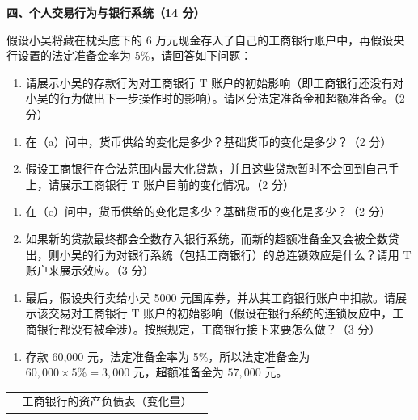 \textbf{四、个人交易行为与银行系统（14 分）}

\begin{question}
假设小吴将藏在枕头底下的 6 万元现金存入了自己的工商银行账户中，再假设央行设置的法定准备金率为 5\%，请回答如下问题：
\begin{enumerate}[label=(\alph*),leftmargin=2.5em]
  \item 请展示小吴的存款行为对工商银行 T 账户的初始影响（即工商银行还没有对小吴的行为做出下一步操作时的影响）。请区分法定准备金和超额准备金。（2 分）
\end{enumerate}
\begin{enumerate}[label=(\alph*),leftmargin=2.5em,resume]
  \item 在（a）问中，货币供给的变化是多少？基础货币的变化是多少？（2 分）
  \item 假设工商银行在合法范围内最大化贷款，并且这些贷款暂时不会回到自己手上，请展示工商银行 T 账户目前的变化情况。（2 分）
\end{enumerate}
\begin{enumerate}[label=(\alph*),leftmargin=2.5em,resume]
  \item 在（c）问中，货币供给的变化是多少？基础货币的变化是多少？（2 分）
  \item 如果新的贷款最终都会全数存入银行系统，而新的超额准备金又会被全数贷出，则小吴的行为对银行系统（包括工商银行）的总连锁效应是什么？请用 T 账户来展示效应。（3 分）
\end{enumerate}
\begin{enumerate}[label=(\alph*),leftmargin=2.5em,resume]
  \item 最后，假设央行卖给小吴 5000 元国库券，并从其工商银行账户中扣款。请展示该交易对工商银行 T 账户的初始影响（假设在银行系统的连锁反应中，工商银行都没有被牵涉）。按照规定，工商银行接下来要怎么做？（3 分）
\end{enumerate}
\begin{solution}
\begin{enumerate}[label=(\alph*),leftmargin=2.5em]
  \item 存款 60,000 元，法定准备金率为 5\%，所以法定准备金为 $60,000\times 5\%=3,000$ 元，超额准备金为 $57,000$ 元。
\end{enumerate}
\begin{center}
\begin{tabular}{|p{0.45\linewidth}|p{0.45\linewidth}|}
\hline
\multicolumn{2}{|c|}{工商银行的资产负债表（变化量）}\\

\end{tabular}
\end{center}
\end{solution}
\end{question}
